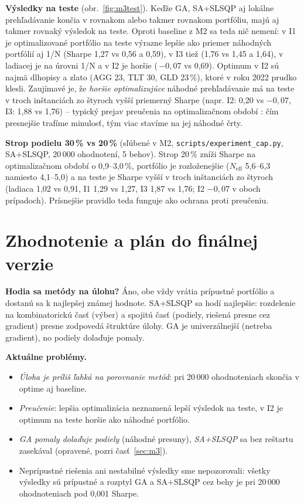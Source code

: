 \documentclass[10pt,a4paper]{article}
\begin{document}
\textbf{Výsledky na teste} (obr.~\ref{fig:m3test}). Keďže GA, SA+SLSQP aj lokálne prehľadávanie končia
v rovnakom alebo takmer rovnakom portfóliu, majú aj takmer rovnaký výsledok na teste. Oproti
baseline z M2 sa teda nič nemení: v I1 je optimalizované portfólio na teste výrazne lepšie ako
priemer náhodných portfólií aj 1/N (Sharpe 1,27 vs 0,56 a 0,59), v I3 tiež (1,76 vs 1,45 a 1,64),
v ladiacej je na úrovni 1/N a v I2 je horšie (\,$-0{,}07$ vs 0,69). Optimum v I2 sú najmä dlhopisy
a zlato (AGG 23, TLT 30, GLD 23\,\%), ktoré v roku 2022 prudko klesli. Zaujímavé je, že
\emph{horšie optimalizujúce} náhodné prehľadávanie má na teste v troch inštanciách zo štyroch vyšší
priemerný Sharpe (napr. I2: 0,20 vs $-0{,}07$, I3: 1,88 vs 1,76) -- typický prejav preučenia
na optimalizačnom období \cite{michaud1989}: čím presnejšie trafíme minulosť, tým viac stavíme na jej
náhodné črty.

\textbf{Strop podielu 30\,\% vs 20\,\%} (sľúbené v M2, \texttt{scripts/experiment\_cap.py}, SA+SLSQP,
20\,000 ohodnotení, 5 behov). Strop 20\,\% zníži Sharpe na optimalizačnom období o 0,9--3,0\,\%,
portfólio je rozloženejšie ($N_\text{eff}$ 5,6--6,3 namiesto 4,1--5,0) a na teste je Sharpe vyšší
v troch inštanciách zo štyroch (ladiaca 1,02 vs 0,91, I1 1,29 vs 1,27, I3 1,87 vs 1,76; I2 $-0{,}07$
v oboch prípadoch). Prísnejšie pravidlo teda funguje ako ochrana proti preučeniu.

\section{Zhodnotenie a plán do finálnej verzie}
\label{sec:plan}

\textbf{Hodia sa metódy na úlohu?} Áno, obe vždy vrátia prípustné portfólio a dostanú sa k najlepšej
známej hodnote. SA+SLSQP sa hodí najlepšie: rozdelenie na kombinatorickú časť (výber) a spojitú časť
(podiely, riešená presne cez gradient) presne zodpovedá štruktúre úlohy. GA je univerzálnejší (netreba
gradient), no podiely dolaďuje pomaly.

\textbf{Aktuálne problémy.}
\begin{itemize}
\item \emph{Úloha je príliš ľahká na porovnanie metód}: pri 20\,000 ohodnoteniach skončia v optime aj baseline.
\item \emph{Preučenie}: lepšia optimalizácia neznamená lepší výsledok na teste, v I2 je optimum na teste
  horšie ako náhodné portfólio.
\item \emph{GA pomaly dolaďuje podiely} (náhodné presuny), \emph{SA+SLSQP} sa bez reštartu zasekával
  (opravené, pozri časť~\ref{sec:m3}).
\item Neprípustné riešenia ani nestabilné výsledky sme nepozorovali: všetky výsledky sú prípustné
  a rozptyl GA a SA+SLSQP cez behy je pri 20\,000 ohodnoteniach pod 0,001 Sharpe.
\end{itemize}
\end{document}
